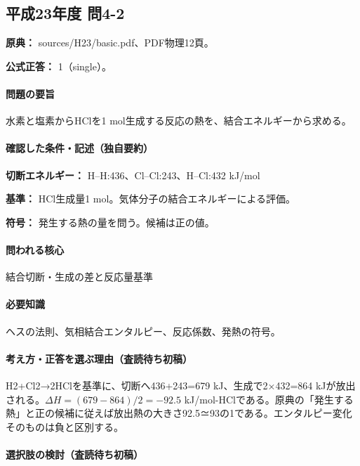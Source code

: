 \subsection{平成23年度 問4-2}
\label{q:h23-reg-basic-4-2}

\noindent\textbf{原典：} sources/H23/basic.pdf、PDF物理12頁。

\textbf{公式正答：} 1（single）。

\paragraph{問題の要旨} 水素と塩素からHClを1 mol生成する反応の熱を、結合エネルギーから求める。

\paragraph{確認した条件・記述（独自要約）}\mbox{}\par

\noindent\textbf{切断エネルギー：} H–H:436、Cl–Cl:243、H–Cl:432 kJ/mol\par

\noindent\textbf{基準：} HCl生成量1 mol。気体分子の結合エネルギーによる評価。\par

\noindent\textbf{符号：} 発生する熱の量を問う。候補は正の値。\par

\paragraph{問われる核心} 結合切断・生成の差と反応量基準

\paragraph{必要知識} ヘスの法則、気相結合エンタルピー、反応係数、発熱の符号。

\paragraph{考え方・正答を選ぶ理由（査読待ち初稿）} H2+Cl2→2HClを基準に、切断へ436+243=\allowbreak{}679 kJ、生成で2×432=\allowbreak{}864 kJが放出される。\(\Delta H=(679-864)/2=-92.5\) kJ/mol-HClである。原典の「発生する熱」と正の候補に従えば放出熱の大きさ92.5≃93の1である。エンタルピー変化そのものは負と区別する。

\paragraph{選択肢の検討（査読待ち初稿）}\mbox{}\par

